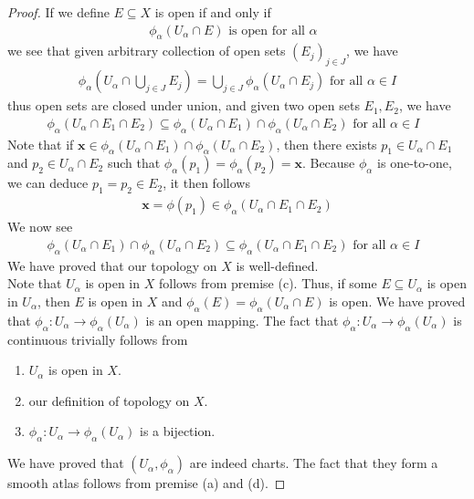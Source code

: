 \documentclass{report}
\begin{document}
\begin{proof}
If we define $E\subseteq X$ is open if and only if 
\begin{align*}
\phi_\alpha  (U_\alpha \cap E)\text{ is open for all $\alpha $ } \end{align*} we see that given arbitrary collection of open sets $(E_j)_{j \in J}$, we have 
\begin{align*}
  \phi_\alpha (U_\alpha \cap \bigcup_{j \in J}E_j)=\bigcup_{j \in J}\phi_\alpha (U_\alpha \cap E_j)\text{ for all }\alpha \in I
\end{align*}
thus open sets are closed under union, and given two open sets $E_1,E_2$,  we have 
\begin{align*}
  \phi_\alpha (U_\alpha \cap E_1\cap E_2) \subseteq \phi_\alpha (U_\alpha \cap E_1)\cap \phi_\alpha (U_\alpha \cap E_2)\text{ for all $\alpha  \in I$ } 
\end{align*}
Note that if $\textbf{x}\in \phi_\alpha (U_\alpha \cap E_1)\cap \phi_\alpha (U_\alpha \cap E_2)$, then there exists $p_1 \in U_\alpha \cap E_1$ and $p_2\in U_\alpha \cap E_2$ such that $\phi_\alpha (p_1)=\phi_\alpha (p_2)=\textbf{x}$. Because $\phi_\alpha $ is one-to-one, we can deduce $p_1=p_2 \in E_2$, it then follows 
 \begin{align*}
\textbf{x}=\phi (p_1)\in \phi_\alpha (U_\alpha \cap E_1\cap E_2)
\end{align*}
We now see 
\begin{align*}
 \phi_\alpha (U_\alpha \cap E_1)\cap \phi_\alpha (U_\alpha \cap E_2)\subseteq \phi_\alpha (U_\alpha \cap E_1\cap E_2) \text{ for all $\alpha  \in I$ } 
\end{align*}
We have proved that our topology on $X$ is well-defined. \\

Note that $U_\alpha $ is open in $X$ follows from premise (c). Thus, if some $E \subseteq U_\alpha $ is open in $U_\alpha $, then $E$ is open in $X$ and  $\phi_\alpha (E)=\phi_\alpha (U_\alpha \cap E)$ is open. We have proved that $\phi_\alpha :U_\alpha \rightarrow \phi_\alpha (U_\alpha )$ is an open mapping. The fact that $\phi_\alpha :U_\alpha \rightarrow \phi_\alpha (U_\alpha )$ is continuous trivially follows from 
\begin{enumerate}[label=(\alph*)]
  \item $U_\alpha $ is open in $X$. 
  \item our definition of topology on $X$.  
  \item $\phi_\alpha :U_\alpha \rightarrow \phi_\alpha (U_\alpha )$ is a bijection.  
\end{enumerate}
We have proved that $(U_\alpha ,\phi_\alpha )$ are indeed charts. The fact that they form a smooth atlas follows from premise (a) and (d). 
\end{proof}
\end{document}
